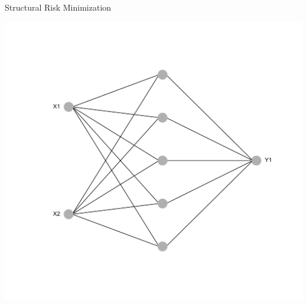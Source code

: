 \documentclass[11pt,compress,t,notes=noshow, xcolor=table]{beamer}
\begin{document}
\begin{frame} {Structural Risk Minimization}
{\begin{center}
\begin{minipage}{0.5\textwidth}
\end{minipage}%
\begin{minipage}{0.5\textwidth}
\includegraphics[width=\linewidth]{figure/nn_size_5.png}
\end{minipage}
\end{center}
}
\end{frame}
\end{document}

